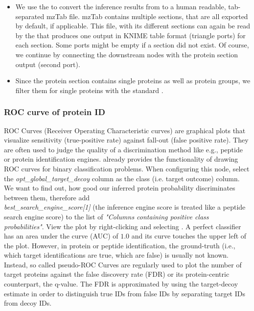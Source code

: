 \begin{itemize}
\item We use the  to convert the inference results from  to a human 
readable, tab-separated mzTab file. mzTab contains multiple sections, that are all exported by default, if 
applicable. This file, with its different sections can again be read by the  that produces one 
output in KNIME table format (triangle ports) for each section. Some ports might be empty if a section did not exist. 
Of course, we continue by connecting the downstream nodes with the protein section output (second port).
\item Since the protein section contains single proteins as well as protein groups, we filter them for single 
proteins with the standard . 
\end{itemize}

\subsubsection{ROC curve of protein ID}

ROC Curves (Receiver Operating Characteristic curves) are graphical plots that visualize sensitivity (true-positive 
rate) against fall-out (false positive rate). They are often used to judge the quality of a discrimination method 
like e.g., peptide or protein identification engines. 
 already provides the functionality of drawing ROC curves for binary classification problems. 
When configuring this node, select the \textit{opt\_global\_target\_decoy} column as the class (i.e. target outcome) 
column. We want to find out, how good our inferred protein probability discriminates between them, therefore add\\
\textit{best\_search\_engine\_score[1]} (the inference engine score is treated like a peptide search engine score) to 
the list of \textit{"Columns containing positive class probabilities"}. View the plot by right-clicking and selecting 
. A perfect classifier has an area under the curve (AUC) of $1.0$ and its curve touches the upper 
left of the plot.
However, in protein or peptide identification, the ground-truth (i.e., which target identifications are true, which 
are false) is usually not known. Instead, so called pseudo-ROC Curves are regularly used to plot the number of target 
proteins against the false discovery rate (FDR) or its protein-centric counterpart, the q-value. 
The FDR is approximated by using the target-decoy estimate in order to distinguish
true IDs from false IDs by separating target IDs from decoy IDs.

